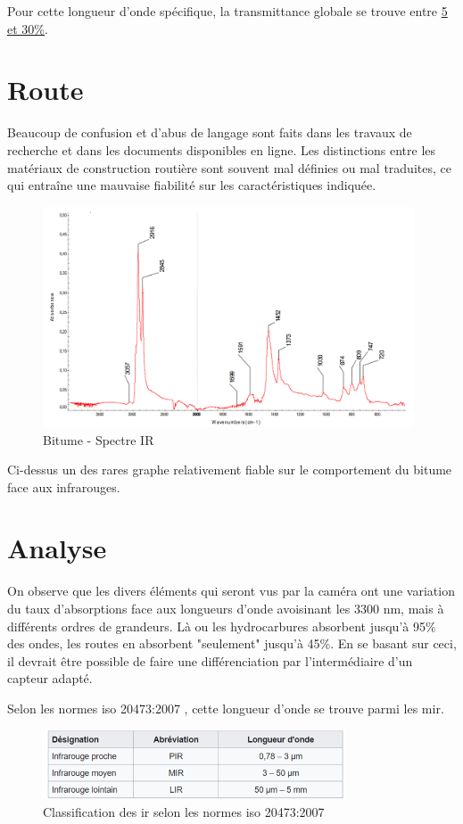 Pour cette longueur d'onde spécifique, la transmittance globale se trouve entre \underline{5 et 30\%}.

\section{Route}
Beaucoup de confusion et d'abus de langage sont faits dans les travaux de recherche et dans les documents disponibles en ligne.
Les distinctions entre les matériaux de construction routière sont souvent mal définies ou mal traduites, ce qui entraîne une mauvaise
fiabilité sur les caractéristiques indiquée.
\begin{figure}[H]
    \centering
    \includegraphics[width=11cm]{assets/figures/bitumeIR.png}
    \caption{Bitume - Spectre IR \cite{Bitume}}
\end{figure}
Ci-dessus un des rares graphe relativement fiable sur le comportement du bitume face aux infrarouges.
\section{Analyse}
On observe que les divers éléments qui seront vus par la caméra ont une variation du taux d'absorptions face aux longueurs d'onde avoisinant les
3300 \si{\nano\metre}, mais à différents ordres de grandeurs. Là ou les hydrocarbures absorbent jusqu'à 95\% des ondes, les routes en absorbent "seulement" jusqu'à 45\%.
En se basant sur ceci, il devrait être possible de faire une différenciation par l'intermédiaire d'un capteur adapté.


Selon les normes \Gls{iso} 20473:2007 \cite{ISO}, cette longueur d'onde se trouve parmi les \Gls{mir}.
\begin{figure}[H]
    \centering
    \includegraphics[width=9cm]{assets/figures/gamme_infra.png}
    \caption{Classification des \Gls{ir} selon les normes \Gls{iso} 20473:2007 \cite{ISO}}
\end{figure}

